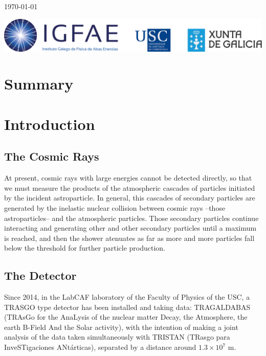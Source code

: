\documentclass{book}
\begin{document}
\begin{titlepage}
	\vfill


	{\large \today\par}
\end{titlepage}


\thispagestyle{empty}
\vfill
\includegraphics[scale=0.25]{LogoIGFAE}


\tableofcontents

\chapter{Summary}

\hspace{13pt} 


\chapter{Introduction}

\section{The Cosmic Rays}

At present, cosmic rays with large energies cannot be detected directly, so that we must measure the products of the atmospheric cascades of particles initiated by the incident astroparticle. In general, this cascades of secondary particles are generated by the inelastic nuclear collision between cosmic rays --those astroparticles-- and the atmospheric particles. Those secondary particles continue interacting and generating other and other secondary particles until a maximum is reached, and then the shower atenuates as far as more and more particles fall below the threshold for further particle production.

\section{The Detector}

Since 2014, in the LabCAF laboratory of the Faculty of Physics of the USC, a TRASGO type detector has been installed and taking data: TRAGALDABAS (TRAsGo for the AnaLysis of the nuclear matter Decay, the Atmosphere, the earth B-Field And the Solar activity), with the intention of making a joint analysis of the data taken simultaneously with TRISTAN (TRasgo para InveSTigaciones ANtárticas), separated by a distance around $1.3 \times 10^7$ m.
\end{document}

